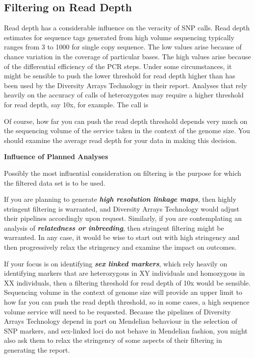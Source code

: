 \documentclass[
  letterpaper,
  DIV=11,
  numbers=noendperiod]{scrreprt}
\let\textttOrig\texttt
\renewcommand{\texttt}[1]{\textttOrig{\color{blue}{#1}}}
\begin{document}
\hypertarget{filtering-on-read-depth}{%
\subsection{Filtering on Read Depth}\label{filtering-on-read-depth}}

Read depth has a considerable influence on the veracity of SNP calls.
Read depth estimates for sequence tags generated from high volume
sequencing typically ranges from 3 to 1000 for single copy sequence. The
low values arise because of chance variation in the coverage of
particular bases. The high values arise because of the differential
efficiency of the PCR steps. Under some circumstances, it might be
sensible to push the lower threshold for read depth higher than has been
used by the Diversity Arrays Technology in their report. Analyses that
rely heavily on the accuracy of calls of heterozygotes may require a
higher threshold for read depth, say 10x, for example. The call is

\texttt{gl.filter.rdepth(gl,threshold=10)}

Of course, how far you can push the read depth threshold depends very
much on the sequencing volume of the service taken in the context of the
genome size. You should examine the average read depth for your data in
making this decision.

\textbf{Influence of Planned Analyses}

Possibly the most influential consideration on filtering is the purpose
for which the filtered data set is to be used.

If you are planning to generate \textbf{\emph{high resolution linkage
maps}}, then highly stringent filtering is warranted, and Diversity
Arrays Technology would adjust their pipelines accordingly upon request.
Similarly, if you are contemplating an analysis of
\textbf{\emph{relatedness or inbreeding}}, then stringent filtering
might be warranted. In any case, it would be wise to start out with high
stringency and then progressively relax the stringency and examine the
impact on outcomes.

If your focus is on identifying \textbf{\emph{sex linked markers}},
which rely heavily on identifying markers that are heterozygous in XY
individuals and homozygous in XX individuals, then a filtering threshold
for read depth of 10x would be sensible. Sequencing volume in the
context of genome size will provide an upper limit to how far you can
push the read depth threshold, so in some cases, a high sequence volume
service will need to be requested. Because the pipelines of Diversity
Arrays Technology depend in part on Mendelian behaviour in the selection
of SNP markers, and sex-linked loci do not behave in Mendelian fashion,
you might also ask them to relax the stringency of some aspects of their
filtering in generating the report.
\end{document}
